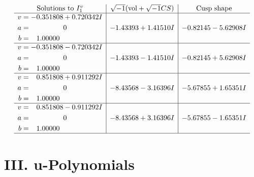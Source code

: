 \documentclass[1p]{elsarticle_modified}
\theoremstyle{definition}
\newcommand{\I}{\sqrt{-1}}
\begin{document}
$$\begin{array}{c|c|c}  
\text{Solutions to }I^v_{1}& \I (\text{vol} + \sqrt{-1}CS) & \text{Cusp shape}\\
 \hline 
\begin{aligned}
v &= -0.351808 + 0.720342 I \\
a &= \phantom{-0.000000 } 0 \\
b &= \phantom{-}1.00000\phantom{ +0.000000I}\end{aligned}
 & -1.43393 + 1.41510 I & -0.82145 - 5.62908 I \\ \hline\begin{aligned}
v &= -0.351808 - 0.720342 I \\
a &= \phantom{-0.000000 } 0 \\
b &= \phantom{-}1.00000\phantom{ +0.000000I}\end{aligned}
 & -1.43393 - 1.41510 I & -0.82145 + 5.62908 I \\ \hline\begin{aligned}
v &= \phantom{-}0.851808 + 0.911292 I \\
a &= \phantom{-0.000000 } 0 \\
b &= \phantom{-}1.00000\phantom{ +0.000000I}\end{aligned}
 & -8.43568 - 3.16396 I & -5.67855 + 1.65351 I \\ \hline\begin{aligned}
v &= \phantom{-}0.851808 - 0.911292 I \\
a &= \phantom{-0.000000 } 0 \\
b &= \phantom{-}1.00000\phantom{ +0.000000I}\end{aligned}
 & -8.43568 + 3.16396 I & -5.67855 - 1.65351 I\\
 \hline 
 \end{array}$$\newpage
\newpage\renewcommand{\arraystretch}{1}
\centering \section*{ III. u-Polynomials}
\end{document}
